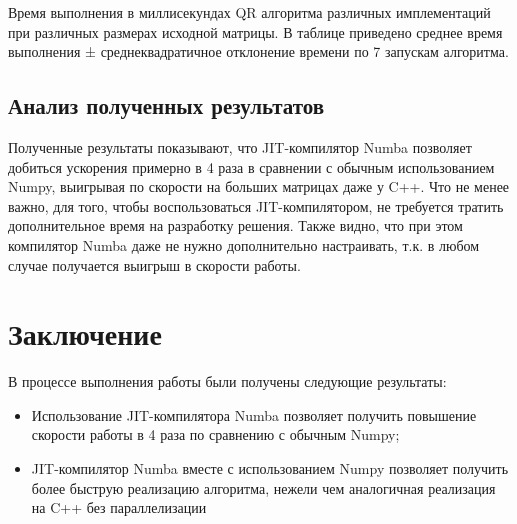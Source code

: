 \documentclass[12pt, fleqn]{article}
\begin{document}
\begin{center}
	
	\begin{table}[h!]
		\caption{Время выполнения в миллисекундах QR алгоритма различных имплементаций при различных размерах исходной матрицы. В таблице приведено среднее время выполнения ± среднеквадратичное отклонение времени по 7 запускам алгоритма.}
		\label{tabular:results}
	\end{table}
\end{center}

\subsection{Анализ полученных результатов}

Полученные результаты показывают, что JIT-компилятор Numba позволяет добиться ускорения примерно в 4 раза в сравнении с обычным использованием Numpy, выигрывая по скорости на больших матрицах даже у C++. Что не менее важно, для того, чтобы воспользоваться JIT-компилятором, не требуется тратить дополнительное время на разработку решения. Также видно, что при этом компилятор Numba даже не нужно дополнительно настраивать, т.к. в любом случае получается выигрыш в скорости работы.

\section{Заключение}

В процессе выполнения работы были получены следующие результаты:
\begin{itemize}
\item Использование JIT-компилятора Numba позволяет получить повышение скорости работы в 4 раза по сравнению с обычным Numpy;
\item JIT-компилятор Numba вместе с использованием Numpy позволяет получить более быструю реализацию алгоритма, нежели чем аналогичная реализация на C++ без параллелизации
\end{itemize}

\def\BibUrl#1.{}\def\BibAnnote#1.{}


\end{document}
